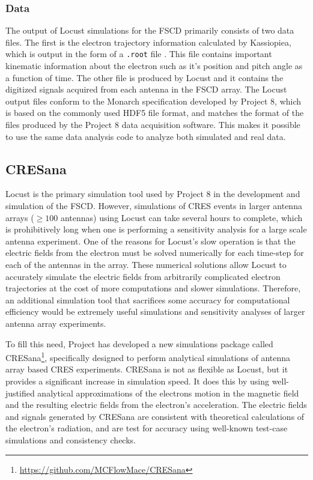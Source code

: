 \subsubsection*{Data}

The output of Locust simulations for the FSCD primarily consists of two data files. The first is the electron trajectory information calculated by Kassiopiea, which is output in the form of a \texttt{.root} file \cite{root}. This file contains important kinematic information about the electron such as it's position and pitch angle as a function of time. The other file is produced by Locust and it contains the digitized signals acquired from each antenna in the FSCD array. The Locust output files conform to the Monarch specification developed by Project 8, which is based on the commonly used HDF5 file format, and matches the format of the files produced by the Project 8 data acquisition software. This makes it possible to use the same data analysis code to analyze both simulated and real data.

\subsection{CRESana}
\label{sec:chap4-cresana}

Locust is the primary simulation tool used by Project 8 in the development and simulation of the FSCD. However, simulations of CRES events in larger antenna arrays ($\geq100$ antennas) using Locust can take several hours to complete, which is prohibitively long when one is performing a sensitivity analysis for a large scale antenna experiment. One of the reasons for Locust's slow operation is that the electric fields from the electron must be solved numerically for each time-step for each of the antennas in the array. These numerical solutions allow Locust to accurately simulate the electric fields from arbitrarily complicated electron trajectories at the cost of more computations and slower simulations. Therefore, an additional simulation tool that sacrifices some accuracy for computational efficiency would be extremely useful simulations and sensitivity analyses of larger antenna array experiments.

To fill this need, Project has developed a new simulations package called CRESana\footnote{\url{https://github.com/MCFlowMace/CRESana}}, specifically designed to perform analytical simulations of antenna array based CRES experiments. CRESana is not as flexible as Locust, but it provides a significant increase in simulation speed. It does this by using well-justified analytical approximations of the electrons motion in the magnetic field and the resulting electric fields from the electron's acceleration. The electric fields and signals generated by CRESana are consistent with theoretical calculations of the electron's radiation, and are test for accuracy using well-known test-case simulations and consistency checks. 

